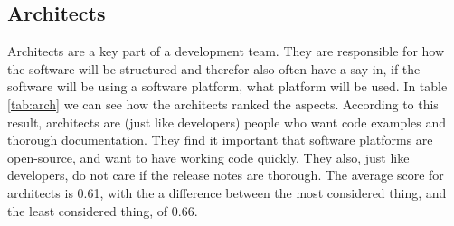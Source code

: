 \documentclass{cslthse-msc}
\begin{document}
    \subsection{Architects}
    Architects are a key part of a development team. They are responsible for how the software will be structured and therefor also often have a say in, if the software will be using a software platform, what platform will be used. In table \ref{tab:arch} we can see how the architects ranked the aspects. According to this result, architects are (just like developers) people who want code examples and thorough documentation. They find it important that software platforms are open-source, and want to have working code quickly. They also, just like developers, do not care if the release notes are thorough. The average score for architects is 0.61, with the a difference between the most considered thing, and the least considered thing, of 0.66.
\end{document}
